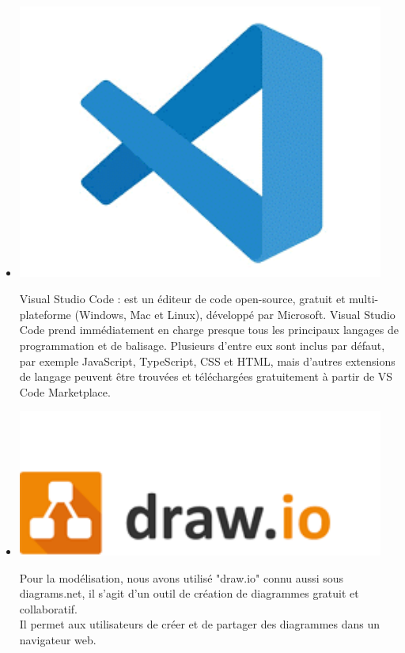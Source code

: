 \begin{itemize}
\item  \begin{minipage}{.15\textwidth}%
	\includegraphics[width=0.95\textwidth]{D) IMAGES/VSCode.png}
\end{minipage}%
Visual Studio Code : est un éditeur de code open-source, gratuit et multi-plateforme (Windows, Mac et Linux), développé par Microsoft.
Visual Studio Code prend immédiatement en charge presque tous les principaux langages de programmation et de balisage. Plusieurs d'entre eux sont inclus par défaut, par exemple JavaScript, TypeScript, CSS et HTML, mais d'autres extensions de langage peuvent être trouvées et téléchargées gratuitement à partir de VS Code Marketplace.
\item \begin{minipage}{.25\textwidth}%
	\includegraphics[width=0.95\textwidth]{D) IMAGES/draw.png}
\end{minipage}%
Pour la modélisation, nous avons utilisé "draw.io" connu aussi sous diagrams.net, il s'agit d'un outil de création de diagrammes gratuit et collaboratif.\\
Il permet aux utilisateurs de créer et de partager des diagrammes dans un navigateur web. 


\end{itemize}
